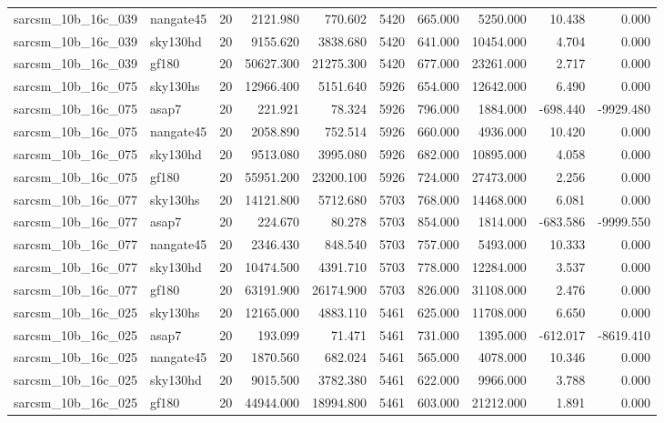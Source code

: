 \begin{longtable}{llrrrrrrrr}
sarcsm\_10b\_16c\_039 & nangate45 & 20 & 2121.980 & 770.602 & 5420 & 665.000 & 5250.000 & 10.438 & 0.000 \\
sarcsm\_10b\_16c\_039 & sky130hd & 20 & 9155.620 & 3838.680 & 5420 & 641.000 & 10454.000 & 4.704 & 0.000 \\
sarcsm\_10b\_16c\_039 & gf180 & 20 & 50627.300 & 21275.300 & 5420 & 677.000 & 23261.000 & 2.717 & 0.000 \\
sarcsm\_10b\_16c\_075 & sky130hs & 20 & 12966.400 & 5151.640 & 5926 & 654.000 & 12642.000 & 6.490 & 0.000 \\
sarcsm\_10b\_16c\_075 & asap7 & 20 & 221.921 & 78.324 & 5926 & 796.000 & 1884.000 & -698.440 & -9929.480 \\
sarcsm\_10b\_16c\_075 & nangate45 & 20 & 2058.890 & 752.514 & 5926 & 660.000 & 4936.000 & 10.420 & 0.000 \\
sarcsm\_10b\_16c\_075 & sky130hd & 20 & 9513.080 & 3995.080 & 5926 & 682.000 & 10895.000 & 4.058 & 0.000 \\
sarcsm\_10b\_16c\_075 & gf180 & 20 & 55951.200 & 23200.100 & 5926 & 724.000 & 27473.000 & 2.256 & 0.000 \\
sarcsm\_10b\_16c\_077 & sky130hs & 20 & 14121.800 & 5712.680 & 5703 & 768.000 & 14468.000 & 6.081 & 0.000 \\
sarcsm\_10b\_16c\_077 & asap7 & 20 & 224.670 & 80.278 & 5703 & 854.000 & 1814.000 & -683.586 & -9999.550 \\
sarcsm\_10b\_16c\_077 & nangate45 & 20 & 2346.430 & 848.540 & 5703 & 757.000 & 5493.000 & 10.333 & 0.000 \\
sarcsm\_10b\_16c\_077 & sky130hd & 20 & 10474.500 & 4391.710 & 5703 & 778.000 & 12284.000 & 3.537 & 0.000 \\
sarcsm\_10b\_16c\_077 & gf180 & 20 & 63191.900 & 26174.900 & 5703 & 826.000 & 31108.000 & 2.476 & 0.000 \\
sarcsm\_10b\_16c\_025 & sky130hs & 20 & 12165.000 & 4883.110 & 5461 & 625.000 & 11708.000 & 6.650 & 0.000 \\
sarcsm\_10b\_16c\_025 & asap7 & 20 & 193.099 & 71.471 & 5461 & 731.000 & 1395.000 & -612.017 & -8619.410 \\
sarcsm\_10b\_16c\_025 & nangate45 & 20 & 1870.560 & 682.024 & 5461 & 565.000 & 4078.000 & 10.346 & 0.000 \\
sarcsm\_10b\_16c\_025 & sky130hd & 20 & 9015.500 & 3782.380 & 5461 & 622.000 & 9966.000 & 3.788 & 0.000 \\
sarcsm\_10b\_16c\_025 & gf180 & 20 & 44944.000 & 18994.800 & 5461 & 603.000 & 21212.000 & 1.891 & 0.000 \\

\end{longtable}
